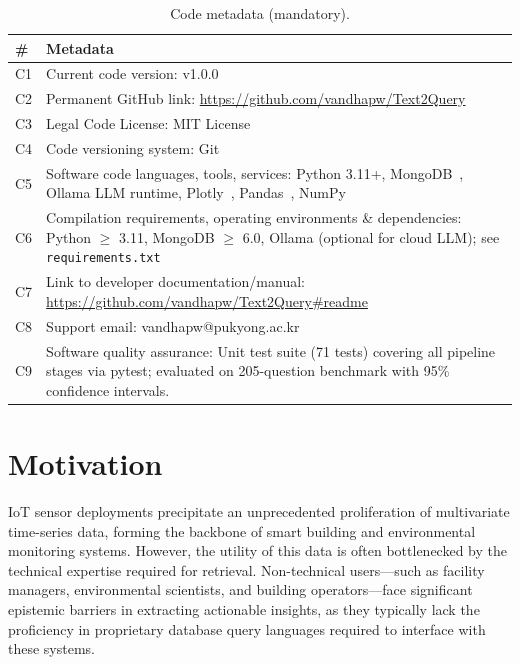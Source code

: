 \documentclass[preprint,12pt,a4paper]{elsarticle}
\begin{document}
\begin{table}[!h]
\centering
\caption{Code metadata (mandatory).}
\label{tab:code-metadata}
\begin{tabular}{|l|p{10cm}|}
\hline
\textbf{\#} & \textbf{Metadata} \\
\hline
C1 & Current code version: v1.0.0 \\
\hline
C2 & Permanent GitHub link: \url{https://github.com/vandhapw/Text2Query} \\
\hline
C3 & Legal Code License: MIT License \\
\hline
C4 & Code versioning system: Git \\
\hline
C5 & Software code languages, tools, services: Python 3.11+, MongoDB~\cite{mongodb}, Ollama LLM runtime, Plotly~\cite{plotly}, Pandas~\cite{mckinney2010pandas}, NumPy \\
\hline
C6 & Compilation requirements, operating environments \& dependencies: Python $\geq$ 3.11, MongoDB $\geq$ 6.0, Ollama (optional for cloud LLM); see \texttt{requirements.txt} \\
\hline
C7 & Link to developer documentation/manual: \url{https://github.com/vandhapw/Text2Query\#readme} \\
\hline
C8 & Support email: vandhapw@pukyong.ac.kr \\
\hline
C9 & Software quality assurance: Unit test suite (71 tests) covering all pipeline stages via pytest; evaluated on 205-question benchmark with 95\% confidence intervals. \\
\hline
\end{tabular}
\end{table}

\section{Motivation}

IoT sensor deployments precipitate an unprecedented proliferation of multivariate time-series data, forming the backbone of smart building and environmental monitoring systems. However, the utility of this data is often bottlenecked by the technical expertise required for retrieval. Non-technical users---such as facility managers, environmental scientists, and building operators---face significant epistemic barriers in extracting actionable insights, as they typically lack the proficiency in proprietary database query languages required to interface with these systems.
\end{document}
